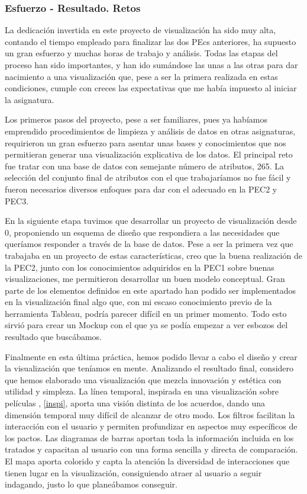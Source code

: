 \documentclass[11pt]{article}
\begin{document}
\subsubsection{Esfuerzo - Resultado. Retos}

La dedicación invertida en este proyecto de visualización ha sido muy alta, contando el tiempo empleado para finalizar las  dos PEcs anteriores, ha supuesto un gran esfuerzo y muchas horas de trabajo y análisis. Todas las etapas del proceso han sido importantes, y han ido sumándose las unas a las otras para dar nacimiento a una visualización que, pese a ser la primera realizada en estas condiciones, cumple con creces las expectativas que me había impuesto al iniciar la asignatura. 

Los primeros pasos del proyecto, pese a ser familiares, pues ya habíamos emprendido procedimientos de limpieza y análisis de datos en otras asignaturas, requirieron un gran esfuerzo para asentar unas bases y conocimientos que nos permitieran generar una visualización explicativa de los datos. El principal reto fue  tratar con una base de datos con semejante número de atributos, 265. La selección del conjunto final de atributos con el que trabajaríamos no fue fácil y fueron necesarios diversos enfoques para dar con el adecuado en la PEC2 y PEC3.

En la siguiente etapa tuvimos que desarrollar un proyecto de visualización desde 0, proponiendo un esquema de diseño que respondiera a las necesidades que queríamos responder a través de la base de datos. Pese a ser la primera vez que trabajaba en un proyecto de estas características, creo que la buena realización de la PEC2, junto con los conocimientos adquiridos en la PEC1 sobre buenas visualizaciones, me permitieron desarrollar un buen modelo conceptual. Gran parte de los elementos definidos en este apartado han podido ser implementados en la visualización final algo que, con mi escaso conocimiento previo de la herramienta Tableau, podría parecer difícil en un primer momento. Todo esto sirvió para crear un Mockup con el que ya se podía empezar a ver esbozos del resultado que buscábamos.

Finalmente en esta última práctica, hemos podido llevar a cabo el diseño y crear la visualización que teníamos en mente. Analizando el resultado final, considero que hemos elaborado una visualización que mezcla innovación y estética con utilidad y simpleza. La línea temporal, inspirada en una visualización sobre películas \cite{true}, \ref{inspi}, aporta una visión distinta de los acuerdos, dando una dimensión temporal muy difícil de alcanzar de otro modo. Los filtros facilitan la interacción con el usuario y permiten profundizar en aspectos muy específicos de los pactos. Las diagramas de barras aportan toda la información incluida en los tratados y capacitan al usuario con una forma sencilla y directa de comparación. El mapa aporta colorido y capta la atención la diversidad de interacciones que tienen lugar en la visualización, consiguiendo atraer al usuario a seguir indagando, justo lo que planeábamos conseguir. 
\end{document}
